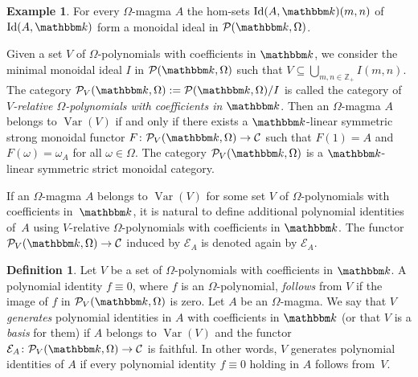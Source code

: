 \documentclass[12pt, reqno, a4paper]{amsart}
\theoremstyle{plain}
\theoremstyle{remark}
\theoremstyle{definition}
\newtheorem{example}[theorem]{Example}
\newtheorem{definition}[theorem]{Definition}
\numberwithin{equation}{section}
\DeclareMathOperator{\Id}{Id}
\begin{document}
 \begin{example}
 	For every $\Omega$-magma $A$ the hom-sets $\Id(A,\mathbbm k)(m,n)$ of $\Id(A,\mathbbm k)$ form a monoidal ideal in $\mathcal P(\mathbbm k, \Omega)$.
 \end{example}
  
 Given a set $V$ of $\Omega$-polynomials with coefficients in $\mathbbm k$, we consider the minimal monoidal ideal $I$
 in $\mathcal P(\mathbbm k, \Omega)$ such that $V \subseteq \bigcup\limits_{m,n\in\mathbb Z_+} I(m,n)$.
 The category $\mathcal P_V(\mathbbm k, \Omega) := \mathcal P(\mathbbm k, \Omega)/I$ is called the category of \textit{$V$-relative
 	$\Omega$-polynomials with coefficients in $\mathbbm k$}. Then an $\Omega$-magma $A$ belongs to $\mathop\mathrm{Var}(V)$
 if and only if there exists a $\mathbbm k$-linear symmetric strong monoidal functor $F \colon \mathcal P_V(\mathbbm k, \Omega) \to \mathcal C$
 such that $F(1)=A$ and $F(\omega)=\omega_A$ for all $\omega \in \Omega$. The category
 $\mathcal P_V(\mathbbm k, \Omega)$ is a $\mathbbm k$-linear symmetric strict monoidal category.
  
 If an $\Omega$-magma $A$ belongs to $\mathop\mathrm{Var}(V)$ for some set $V$ of $\Omega$-polynomials with coefficients in~$\mathbbm k$, it is natural to define additional polynomial identities of~$A$ using $V$-relative
 $\Omega$-polynomials with coefficients in $\mathbbm k$. The functor $\mathcal P_V(\mathbbm k, \Omega) \to \mathcal C$
 induced by $\mathcal E_A$ is denoted again by $\mathcal E_A$.
 
 \begin{definition} Let $V$ be a set of $\Omega$-polynomials with coefficients in $\mathbbm k$.
 	A polynomial identity $f\equiv 0$, where $f$ is an $\Omega$-polynomial, \textit{follows} from $V$
 	 if the image of $f$ in $\mathcal P_V(\mathbbm k, \Omega)$ is zero.
 	Let $A$ be an $\Omega$-magma.  We say that $V$ \textit{generates}
 	polynomial identities in $A$  with coefficients in $\mathbbm k$ (or that $V$ is a \textit{basis} for them) if $A$
 	belongs to $\mathop\mathrm{Var}(V)$
 	and the functor $\mathcal E_A \colon \mathcal P_V(\mathbbm k, \Omega) \to \mathcal C$ is faithful. In other words, $V$ generates polynomial identities of $A$ if every polynomial identity $f \equiv 0$ holding in $A$ follows from~$V$.
 \end{definition}	
 
\end{document}
